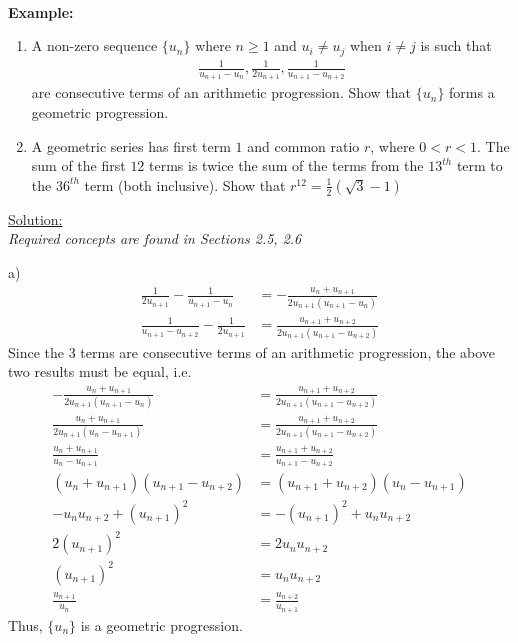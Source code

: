 \documentclass[12pt, a4paper, titlepage]{article}
\begin{document}
\textbf{\\ Example:}

\begin{enumerate}[label=(\alph*)]
    \item A non-zero sequence $\{u_n\}$ where $n \ge 1$ and $u_i \neq u_j$ when $i \neq j$ is such that
    \begin{align*}
        \frac{1}{u_{n + 1} - u_n}, \frac{1}{2u_{n + 1}}, \frac{1}{u_{n + 1} - u_{n + 2}}
    \end{align*}
    are consecutive terms of an arithmetic progression. Show that $\{u_n\}$ forms a geometric progression.
    \item A geometric series has first term $1$ and common ratio $r$, where $0 < r < 1$. The sum of the first $12$ terms is twice the sum of the terms from the $13^{th}$ term to the $36^{th}$ term (both inclusive). Show that $r^{12} = \frac{1}{2}(\sqrt{3} - 1)$
\end{enumerate}

\begin{flushright}
\end{flushright}

\underline{Solution:} \\
\emph{Required concepts are found in Sections 2.5, 2.6}

a)
\begin{align*}
    \frac{1}{2u_{n + 1}} - \frac{1}{u_{n + 1} - u_n} &= -\frac{u_n + u_{n + 1}}{2u_{n + 1}(u_{n + 1} - u_n)} \\
    \frac{1}{u_{n + 1} - u_{n + 2}} - \frac{1}{2u_{n + 1}} &= \frac{u_{n + 1} + u_{n + 2}}{2u_{n + 1}(u_{n + 1} - u_{n + 2})}
\end{align*}
Since the 3 terms are consecutive terms of an arithmetic progression, the above two results must be equal, i.e.
\begin{align*}
    -\frac{u_n + u_{n + 1}}{2u_{n + 1}(u_{n + 1} - u_n)} &= \frac{u_{n + 1} + u_{n + 2}}{2u_{n + 1}(u_{n + 1} - u_{n + 2})} \\
    \frac{u_n + u_{n + 1}}{2u_{n + 1}(u_n - u_{n + 1})} &= \frac{u_{n + 1} + u_{n + 2}}{2u_{n + 1}(u_{n + 1} - u_{n + 2})} \\
    \frac{u_n + u_{n + 1}}{u_n - u_{n + 1}} &= \frac{u_{n + 1} + u_{n + 2}}{u_{n + 1} - u_{n + 2}} \\
    (u_n + u_{n + 1})(u_{n + 1} - u_{n + 2}) &= (u_{n + 1} + u_{n + 2})(u_n - u_{n + 1}) \\
    - u_nu_{n + 2} + (u_{n + 1})^2 &= - (u_{n + 1})^2 + u_nu_{n + 2} \\
    2(u_{n + 1})^2 &= 2u_nu_{n + 2} \\
    (u_{n + 1})^2 &= u_nu_{n + 2} \\
    \frac{u_{n + 1}}{u_n} &= \frac{u_{n + 2}}{u_{n + 1}}
\end{align*}
Thus, $\{u_n\}$ is a geometric progression.
\end{document}

